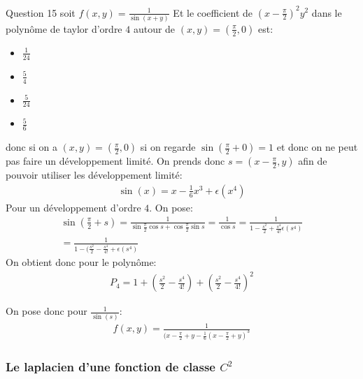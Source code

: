 \begin{parag}{Question 15}
    soit $f(x, y) = \frac{1}{\sin(x + y)}$ Et le coefficient de $(x - \frac{\pi}{2})^2y^2$ dans le polynôme de taylor d'ordre $4$ autour de $(x, y) = ( \frac{\pi}{2}, 0)$ est:
    \begin{itemize}
        \item $ \frac{1}{24}$
        \item $ \frac{5}{4}$
        \item $ \frac{5}{24}$ 
        \item $ \frac{5}{6}$
    \end{itemize}

    donc si on a $(x, y) = ( \frac{\pi}{2}, 0)$ si on regarde $\sin( \frac{\pi}{2} + 0) = 1$ et donc on ne peut pas faire un développement limité. On prends donc $s = ( x - \frac{\pi}{2}, y)$ afin de pouvoir utiliser les développement limité:
    \begin{align*}
        \sin(x) = x - \frac{1}{6}x^3 + \epsilon (x^4)
    \end{align*}
    Pour un développement d'ordre $4$. On pose:
    \begin{align*}
        \sin( \frac{\pi}{2} + s) = \frac{1}{\sin \frac{\pi}{2}\cos s + \cos \frac{\pi}{2}\sin s} = \frac{1}{\cos s} = \frac{1}{1 - \frac{s^2}{2} + \frac{s^4}{4!} \epsilon(s^4)}\\
        = \frac{1}{1 - ( \frac{s^2}{2} - \frac{s^4}{4!} + \epsilon(s^4)}
    \end{align*}
    On obtient donc pour le polynôme:
    \begin{align*}
        P_4 = 1 + ( \frac{s^2}{2} - \frac{s^4}{4!}) + ( \frac{s^2}{2} - \frac{s^4}{4!})^2
    \end{align*}
    
   On pose donc pour $ \frac{1}{\sin(s)}$:
   \begin{align*}
       f(x, y) = \frac{1}{(x - \frac{\pi}{2} + y - \frac{1}{6}(x - \frac{\pi}{2} + y)^3}
   \end{align*}

   

\end{parag}
\subsubsection{Le laplacien d'une fonction de classe $C^2$}

